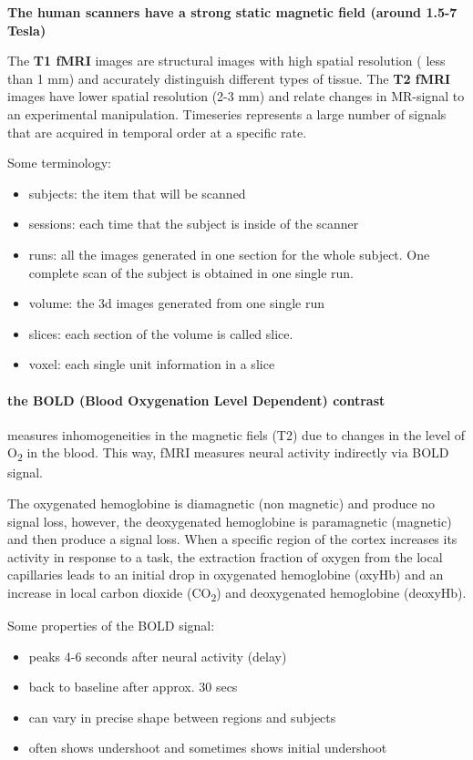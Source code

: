 \documentclass[12pt,article,oneside,a4paper]{memoir}
\begin{document}
\textbf{The human scanners have a strong static magnetic field (around 1.5-7 Tesla)}

The \textbf{T1 fMRI} images are structural images with high spatial resolution ( less than 1 mm) and accurately distinguish different types of tissue. The \textbf{T2 fMRI} images have lower spatial resolution (2-3 mm) and relate changes in MR-signal to an experimental manipulation. Timeseries represents a large number of signals that are acquired in temporal order at a specific rate.

Some terminology:
\begin{itemize}
\item subjects: the item that will be scanned
\item sessions: each time that the subject is inside of the scanner
\item runs: all the images generated in one section for the whole subject. One complete scan of the subject is obtained in one single run.
\item volume: the 3d images generated from one single run
\item slices: each section of the volume is called slice.
\item voxel: each single unit information in a slice
\end{itemize}

\paragraph{the BOLD (Blood Oxygenation Level Dependent) contrast} measures inhomogeneities in the magnetic fiels (T2) due to changes in the level of O\textsubscript{2} in the blood. This way, fMRI measures neural activity indirectly via BOLD signal.

The oxygenated hemoglobine is diamagnetic (non magnetic) and produce no signal loss, however, the deoxygenated hemoglobine is paramagnetic (magnetic) and then produce a signal loss. When a specific region of the cortex increases its activity in response to a task, the extraction fraction of oxygen from the local capillaries leads to an initial drop in oxygenated hemoglobine (oxyHb) and an increase in local carbon dioxide (CO\textsubscript{2}) and deoxygenated hemoglobine (deoxyHb). 

Some properties of the BOLD signal:
\begin{itemize}
\item peaks 4-6 seconds after neural activity (delay)
\item back to baseline after approx. 30 secs
\item can vary in precise shape between regions and subjects
\item often shows undershoot and sometimes shows initial undershoot
\end{itemize}
\end{document}
